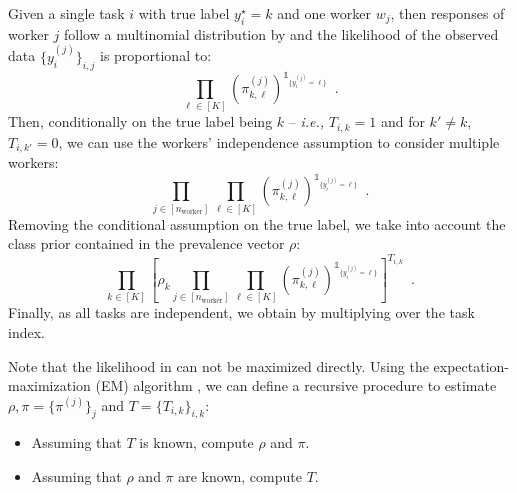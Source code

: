 \begin{constructionbox}
Given a single task $i$ with true label $y_i^\star=k$ and one worker $w_j$, then responses of worker $j$ follow a multinomial distribution by  and the likelihood of the observed data $\{y_i^{(j)}\}_{i,j}$ is proportional to:
\begin{equation*}
    \prod_{\ell\in[K]}\left(\pi^{(j)}_{k,\ell}\right)^{\mathds{1}_{\{y_i^{(j)}=\ell\}}} \enspace.
\end{equation*}
Then, conditionally on the true label being $k$ -- \emph{i.e.,} $T_{i,k}=1$ and for $k'\neq k$, $T_{i,k'}=0$, we can use the workers' independence assumption to consider multiple workers:
\begin{equation*}
    \prod_{j\in [n_{\text{worker}}]}\prod_{\ell\in[K]}\left(\pi^{(j)}_{k,\ell}\right)^{\mathds{1}_{\{y_i^{(j)}=\ell\}}} \enspace.
\end{equation*}
Removing the conditional assumption on the true label, we take into account the class prior contained in the prevalence vector $\rho$:
\begin{equation*}
    \prod_{k\in[K]} \left[\rho_k\prod_{j\in [n_{\text{worker}}]}\prod_{\ell\in[K]}\left(\pi^{(j)}_{k,\ell}\right)^{\mathds{1}_{\{y_i^{(j)}=\ell\}}}\right]^{T_{i,k}} \enspace.
\end{equation*}
Finally, as all tasks are independent, we obtain  by multiplying over the task index.
\end{constructionbox}

Note that the likelihood in  can not be maximized directly.
Using the expectation-maximization (EM) algorithm \citep{Dempster_Laird_Rubin77}, we can define a recursive procedure to estimate $\rho,\pi=\{\pi^{(j)}\}_j$ and $T=\{T_{i,k}\}_{i,k}$:
\begin{itemize}
    \item Assuming that $T$ is known, compute $\rho$ and $\pi$.
    \item Assuming that $\rho$ and $\pi$ are known, compute $T$.
\end{itemize}

